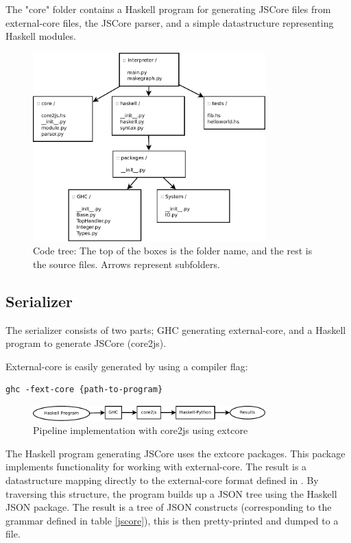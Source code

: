 The "core" folder contains a Haskell program for generating JSCore files from external-core
files, the JSCore parser, and a simple datastructure representing Haskell modules.

\begin{figure}[H]
\centering
\includegraphics[width=0.8\textwidth]{diags/organization}
\caption{Code tree: The top of the boxes is the folder name, and the rest is the source 
files. Arrows represent subfolders.}
\label{organization}
\end{figure}

\subsection{Serializer}

The serializer consists of two parts; GHC generating external-core, and 
a Haskell program to generate JSCore (core2js).

External-core is easily generated by using a compiler flag:
\begin{lstlisting}
ghc -fext-core {path-to-program}
\end{lstlisting}

\begin{figure}[H]
\centering
\includegraphics[width=0.8\textwidth]{diags/pipe_w_core2js}
\caption{Pipeline implementation with core2js using extcore}
\label{core2js}
\end{figure}

The Haskell program generating JSCore uses the extcore packages. This package
implements functionality for working with external-core. The result is a datastructure
mapping directly to the external-core format defined in \cite{tolmach2010ghc}. By traversing
this structure, the program builds up a JSON tree using the Haskell JSON package.
The result is a tree of JSON constructs (corresponding to the grammar defined in table \ref{jscore}), 
this is then pretty-printed and dumped to a file.

